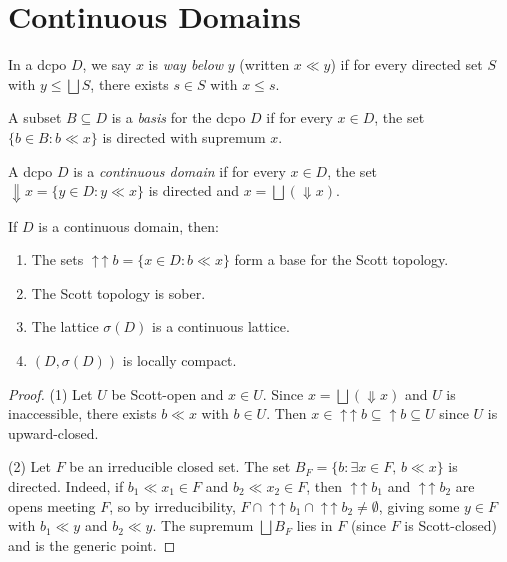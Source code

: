\section{Continuous Domains}

\begin{definition}
In a dcpo $D$, we say $x$ is \emph{way below} $y$ (written $x \ll y$) if for every
directed set $S$ with $y \leq \bigsqcup S$, there exists $s \in S$ with $x \leq s$.
\end{definition}

\begin{definition}
A subset $B \subseteq D$ is a \emph{basis} for the dcpo $D$ if for every $x \in D$, the
set $\{b \in B : b \ll x\}$ is directed with supremum $x$.
\end{definition}

\begin{definition}
A dcpo $D$ is a \emph{continuous domain} if for every $x \in D$, the set
$\mathop{\Downarrow}\! x = \{y \in D : y \ll x\}$ is directed and
$x = \bigsqcup(\mathop{\Downarrow}\! x)$.
\end{definition}

\begin{theorem}
If $D$ is a continuous domain, then:
\begin{enumerate}
  \item The sets $\mathop{\uparrow\!\!\uparrow} b = \{x \in D : b \ll x\}$ form a base
    for the Scott topology.
  \item The Scott topology is sober.
  \item The lattice $\sigma(D)$ is a continuous lattice.
  \item $(D,\sigma(D))$ is locally compact.
\end{enumerate}
\end{theorem}

\begin{proof}
(1) Let $U$ be Scott-open and $x \in U$. Since $x = \bigsqcup(\mathop{\Downarrow}\! x)$
and $U$ is inaccessible, there exists $b \ll x$ with $b \in U$. Then
$x \in \mathop{\uparrow\!\!\uparrow} b \subseteq \uparrow\! b \subseteq U$ since $U$ is
upward-closed.

(2) Let $F$ be an irreducible closed set. The set
$B_F = \{b : \exists x \in F,\, b \ll x\}$ is directed. Indeed, if $b_1 \ll x_1 \in F$
and $b_2 \ll x_2 \in F$, then $\mathop{\uparrow\!\!\uparrow} b_1$ and
$\mathop{\uparrow\!\!\uparrow} b_2$ are opens meeting $F$, so by irreducibility,
$F \cap \mathop{\uparrow\!\!\uparrow} b_1 \cap \mathop{\uparrow\!\!\uparrow} b_2 \neq
\emptyset$, giving some $y \in F$ with $b_1 \ll y$ and $b_2 \ll y$. The supremum
$\bigsqcup B_F$ lies in $F$ (since $F$ is Scott-closed) and is the generic point.
\end{proof}

